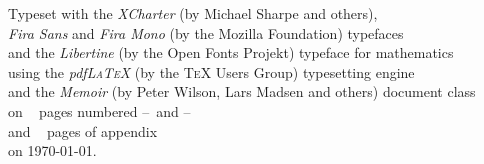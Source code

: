 \cleartoverso
\thispagestyle{empty}

\vspace*{0pt plus 1fill}

{ \centering\footnotesize
  Typeset with the \emph{XCharter} (by Michael Sharpe and others),\\
  \emph{Fira Sans} and \emph{Fira Mono} (by the Mozilla Foundation) typefaces\\
  and the \emph{Libertine} (by the Open Fonts Projekt) typeface for mathematics\\
  using the \emph{pdfL\textsc{a}T\textsc{e}X} (by the T\textsc{e}X Users Group) typesetting engine\\
  and the \emph{Memoir} (by Peter Wilson, Lars Madsen and others) document class\\
  on \PagesWithoutAppendix\  pages numbered \FirstFrontMatterPage--\LastFrontMatterPage\ and \FirstMainMatterPage--\LastMainMatterPage\\
  and \PagesAppendix\  pages of appendix\\
  on \today.
  \par
}


